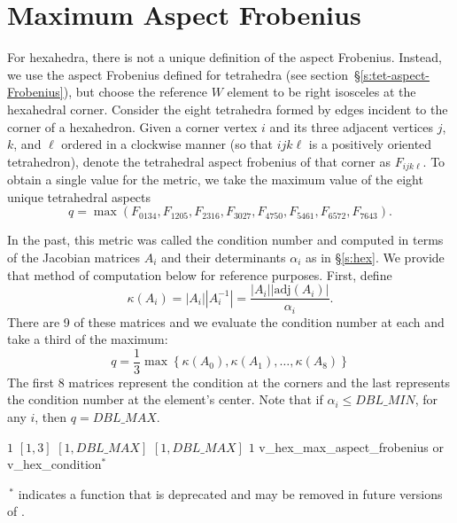 \section{Maximum Aspect Frobenius}

For hexahedra, there is not a unique definition of the aspect Frobenius.
Instead, we use the aspect Frobenius
defined for tetrahedra (see section~\S\ref{s:tet-aspect-Frobenius}),
but choose the reference $W$ element to be right isosceles at
the hexahedral corner. Consider the eight tetrahedra formed by edges
incident to the corner of a hexahedron. 
Given a corner vertex $i$ and its three adjacent vertices $j$, $k$, and $\ell$ ordered
in a clockwise manner (so that $ijk\ell$ is a positively oriented tetrahedron),
denote the tetrahedral aspect frobenius of that corner as $F_{ijk\ell}$.
To obtain a single value for the metric, we take the maximum value of the eight unique tetrahedral aspects
\[
  q = \max\left(F_{0134}, F_{1205}, F_{2316}, F_{3027}, F_{4750}, F_{5461}, F_{6572}, F_{7643} \right).
\]

In the past, this metric was called the condition number and computed 
in terms of the Jacobian matrices $A_i$ and
their determinants $\alpha_i$ as in \S\ref{s:hex}.
We provide that method of computation below for reference purposes.
First, define
\[
\kappa(A_i)
  = \left|A_i\right| \left|A_i^{-1}\right|
  = \frac {\left|A_i\right| \left|\mathrm{adj}(A_i)\right|}{\alpha_i}.
\]
There are 9 of these matrices and we evaluate the condition number at each and take a third of the maximum:
\[
q = \frac {1}{3} \max\left\{ \kappa(A_0), \kappa(A_1), \ldots, \kappa(A_8) \right\}
\]
The first 8 matrices represent the condition at the corners and the last represents the condition number
at the element's center.
Note that if $\alpha_i \leq DBL\_MIN$, for any $i$, then $q = DBL\_MAX$.

%
{$1$}%
{$[1,3]$}%
{$[1,DBL\_MAX]$}%
{$[1,DBL\_MAX]$}%
{$1$}%
{\cite{knu:00}}%
{v\_hex\_max\_aspect\_frobenius \textnormal{or} %
 v\_hex\_condition$^*$}%

\noindent\,$^*$ indicates a function that is deprecated and may be removed in future versions of \verd.
